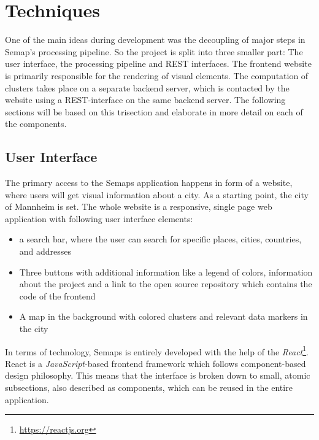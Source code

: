 \section{Techniques}
One of the main ideas during development was the decoupling of major steps in Semap’s processing pipeline. So the project is split into three smaller part: The user interface, the processing pipeline and REST interfaces. 
The frontend website is primarily responsible for the rendering of visual elements. The computation of clusters takes place on a separate backend server, which is contacted by the website using a REST-interface on the same backend server. The following sections will be based on this trisection and elaborate in more detail on each of the components.

\subsection{User Interface}
The primary access to the Semaps application happens in form of a website, where users will get visual information about a city. As a starting point, the city of Mannheim is set. The whole website is a responsive, single page web application with following user interface elements: 
\begin{itemize}
\item a search bar, where the user can search for specific places, cities, countries, and addresses
\item Three buttons with additional information like a legend of colors, information about the project and a link to the open source repository which contains the code of the frontend
\item A map in the background with colored clusters and relevant data markers in the city
\end{itemize}

In terms of technology, Semaps is entirely developed with the help of the \textit{React}\footnote{ \url{https://reactjs.org}}. React is a \textit{JavaScript}-based frontend framework which follows component-based design philosophy. This means that the interface is broken down to small, atomic subsections, also described as components, which can be reused in the entire application.

